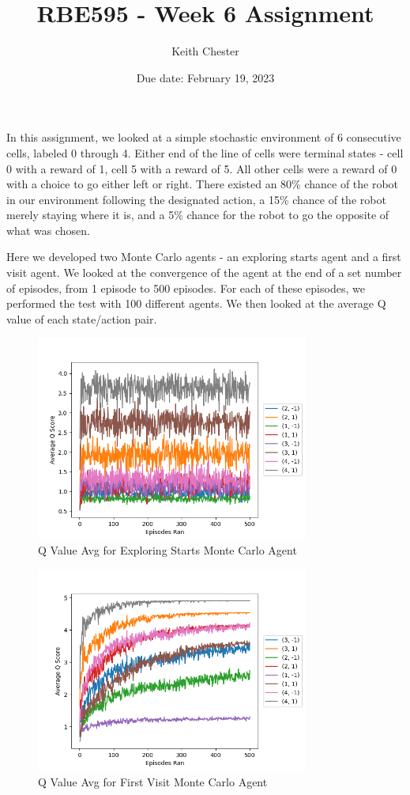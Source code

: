 \documentclass{article}
\title{RBE595 - Week 6 Assignment}
\author{Keith Chester}
\date{Due date: February 19, 2023}
\begin{document}
\maketitle

In this assignment, we looked at a simple stochastic environment of 6 consecutive cells, labeled 0 through 4. Either end of the line of cells were terminal states - cell 0 with a reward of 1, cell 5 with a reward of 5. All other cells were a reward of 0 with a choice to go either left or right. There existed an 80\% chance of the robot in our environment following the designated action, a 15\% chance of the robot merely staying where it is, and a 5\% chance for the robot to go the opposite of what was chosen.

Here we developed two Monte Carlo agents - an exploring starts agent and a first visit agent. We looked at the convergence of the agent at the end of a set number of episodes, from 1 episode to 500 episodes. For each of these episodes, we performed the test with 100 different agents. We then looked at the average Q value of each state/action pair.

\begin{figure}
    \centering
    \includegraphics[width = 0.8\textwidth]{results_exploring_start.png}
    \caption{Q Value Avg for Exploring Starts Monte Carlo Agent}
\end{figure}

\begin{figure}
    \centering
    \includegraphics[width = 0.8\textwidth]{results_first_visit.png}
    \caption{Q Value Avg for First Visit Monte Carlo Agent}
\end{figure}
\end{document}
